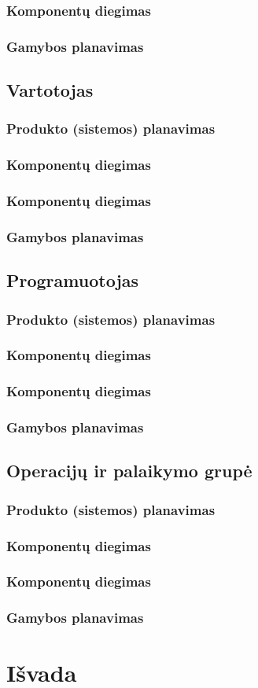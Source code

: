 \documentclass{VUMIFPSkursinis}
\begin{document}
\subsubsection{Komponentų diegimas}
\subsubsection{Gamybos planavimas}
\subsection{Vartotojas}
\subsubsection{Produkto (sistemos) planavimas}
\subsubsection{Komponentų diegimas}
\subsubsection{Komponentų diegimas}
\subsubsection{Gamybos planavimas}
\subsection{Programuotojas}
\subsubsection{Produkto (sistemos) planavimas}
\subsubsection{Komponentų diegimas}
\subsubsection{Komponentų diegimas}
\subsubsection{Gamybos planavimas}
\subsection{Operacijų ir palaikymo grupė}
\subsubsection{Produkto (sistemos) planavimas}
\subsubsection{Komponentų diegimas}
\subsubsection{Komponentų diegimas}
\subsubsection{Gamybos planavimas}

\section{Išvada}
\end{document}
